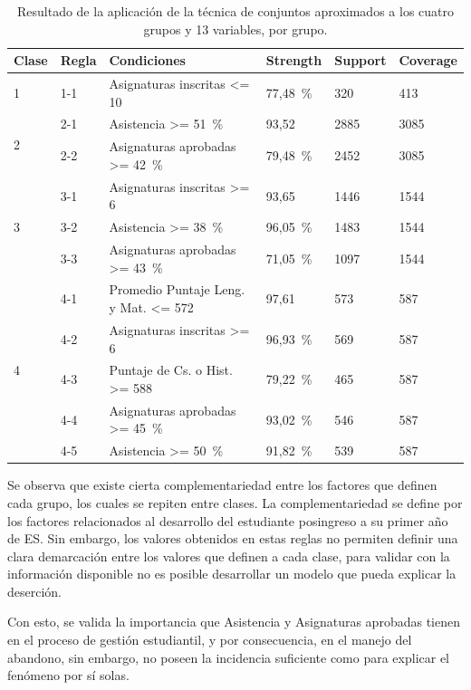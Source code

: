 \documentclass[portuguese]{textolivre}
\begin{document}
\begin{table}[htbp]
    \caption{Resultado de la aplicación de la técnica de conjuntos aproximados a los cuatro grupos y 13 variables, por grupo.}
    \label{Tabla 10}
    \centering
    \begin{tabular}{llp{5cm}lll}
    \toprule
    Clase & Regla & Condiciones & Strength & Support & Coverage\\
    \midrule
    1 & 1-1 & Asignaturas inscritas <= 10 & 77,48~\% & 320 & 413\\
    \cmidrule{1-6}
    \multirow{2}{*}{2} & 2-1 & Asistencia >= 51~\% & 93,52 & 2885 & 3085\\
    & 2-2 & Asignaturas aprobadas >= 42~\% & 79,48~\% & 2452 & 3085\\
    \cmidrule{1-6}
    \multirow{3}{*}{3} & 3-1 & Asignaturas inscritas >= 6 & 93,65 & 1446 & 1544\\
    & 3-2 & Asistencia >= 38~\% & 96,05~\% & 1483 & 1544\\
    & 3-3 & Asignaturas aprobadas >= 43~\% & 71,05~\% & 1097 & 1544\\
    \cmidrule{1-6}
    \multirow{5}{*}{4} & 4-1 & Promedio Puntaje Leng. y Mat. <= 572 & 97,61 & 573 & 587\\
    & 4-2 & Asignaturas inscritas >= 6 & 96,93~\% & 569 & 587\\
    & 4-3 & Puntaje de Cs. o Hist. >= 588 & 79,22~\% & 465 & 587\\
    & 4-4 & Asignaturas aprobadas >= 45~\% & 93,02~\% & 546 & 587\\
    & 4-5 & Asistencia >= 50~\% & 91,82~\% & 539 & 587\\
    \bottomrule
    \end{tabular}
\end{table}

Se observa que existe cierta complementariedad entre los factores que definen cada grupo, los cuales se repiten entre clases. La complementariedad se define por los factores relacionados al desarrollo del estudiante posingreso a su primer año de ES. Sin embargo, los valores obtenidos en estas reglas no permiten definir una clara demarcación entre los valores que definen a cada clase, para validar con la información disponible no es posible desarrollar un modelo que pueda explicar la deserción.

Con esto, se valida la importancia que Asistencia y Asignaturas aprobadas tienen en el proceso de gestión estudiantil, y por consecuencia, en el manejo del abandono, sin embargo, no poseen la incidencia suficiente como para explicar el fenómeno por sí solas.
\end{document}
